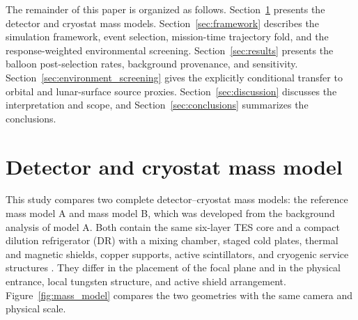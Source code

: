 \documentclass[11pt]{article}
\begin{document}
The remainder of this paper is organized as follows. Section~\ref{sec:geometry}
presents the detector and cryostat mass models. Section~\ref{sec:framework}
describes the simulation framework, event selection, mission-time trajectory
fold, and the response-weighted environmental screening. Section~\ref{sec:results}
presents the balloon post-selection rates, background provenance, and
sensitivity. Section~\ref{sec:environment_screening} gives the explicitly
conditional transfer to orbital and lunar-surface source proxies.
Section~\ref{sec:discussion} discusses the interpretation and scope, and
Section~\ref{sec:conclusions} summarizes the conclusions.

\endgroup

\section{Detector and cryostat mass model}
\label{sec:geometry}

This study compares two complete detector--cryostat mass models: the reference
mass model A and mass model B, which was developed from the background analysis
of model A. Both contain the same six-layer TES core and a compact dilution
refrigerator (DR) with a mixing chamber, staged cold plates, thermal and magnetic
shields, copper supports, active scintillators, and cryogenic service structures
\cite{Shirazi2023,Gottardi2021TESReview}. They differ in the placement of the
focal plane and in the physical entrance, local tungsten structure, and active
shield arrangement. Figure~\ref{fig:mass_model} compares the two geometries with
the same camera and physical scale.
\end{document}

